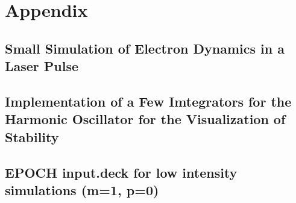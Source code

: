 \documentclass[12pt, class=report, crop=false]{standalone}
\begin{document}
\chapter*{Appendix}%

\section*{Small Simulation of Electron Dynamics in a Laser Pulse}



\newpage
\section*{Implementation of a Few Imtegrators for the Harmonic Oscillator for the Visualization of Stability}



\section*{EPOCH input.deck for low intensity simulations (m=1, p=0)}
\end{document}
